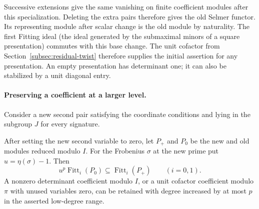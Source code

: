 Successive extensions give the same vanishing on finite
coefficient modules after this specialization. Deleting the
extra pairs therefore gives the old Selmer functor. Its representing
module after scalar change is the old module by naturality.
The first Fitting ideal (the ideal generated by the submaximal
minors of a square presentation) commutes with this base change.
The unit cofactor from Section~\ref{subsec:residual-twist}
therefore supplies the initial assertion for any presentation.
An empty presentation has determinant one; it can also be
stabilized by a unit diagonal entry.

\paragraph{Preserving a coefficient at a larger level.}
Consider a new second pair satisfying the coordinate conditions
and lying in the subgroup \(J\) for every signature.
\begin{lemma}
After setting the new second variable to zero, let \(P_+\) and
\(P_0\) be the new and old modules reduced modulo \(I\).
For the Frobenius \(\sigma\) at the new prime put \(u=\eta(\sigma)-1\).
Then
\[
 u^p\operatorname{Fitt}_i(P_0)\subseteq\operatorname{Fitt}_i(P_+)\qquad(i=0,1).
\] A nonzero determinant coefficient modulo \(I\), or
a unit cofactor coefficient modulo \(\pi\) with unused variables
zero, can be retained with degree increased by at most \(p\)
in the asserted low-degree range.
\end{lemma}
